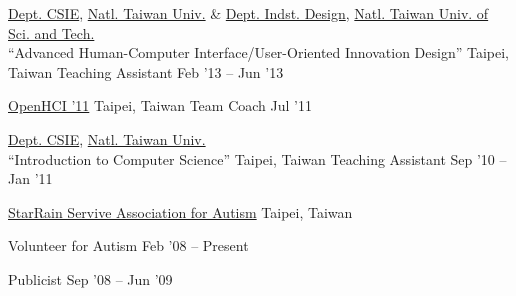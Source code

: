 \documentclass[10pt, a4paper]{article} %
\begin{document}


\headedsection
{
 \href{http://www.csie.ntu.edu.tw}{Dept. CSIE},
 \href{http://www.ntu.edu.tw}{Natl. Taiwan Univ.} \&
 \href{http://www.dt.ntust.edu.tw/}{Dept. Indst. Design},
 \href{http://www.ntust.edu.tw}{Natl. Taiwan Univ. of Sci. and Tech.}\\
 ``Advanced Human-Computer Interface/User-Oriented Innovation Design''
}
{Taipei, Taiwan}{
	\headedsubsection
	{Teaching Assistant}
	{Feb '13 -- Jun '13}
	{
	}
}

\headedsection
{
 \href{http://www.opehci.com/2011/}{OpenHCI '11}
}
{Taipei, Taiwan}{
	\headedsubsection
	{Team Coach}
	{Jul '11}
	{
	}
}

\headedsection
{
 \href{http://www.csie.ntu.edu.tw}{Dept. CSIE},
 \href{http://www.ntu.edu.tw}{Natl. Taiwan Univ.}\\
 ``Introduction to Computer Science''
}
{Taipei, Taiwan}{
	\headedsubsection
	{Teaching Assistant}
	{Sep '10 -- Jan '11}
	{
	}
}


\spacedhrule{1.5em}{-1em} %



\headedsection
{\href{http://goo.gl/2Dmqrj}{StarRain Servive Association for Autism}}
{Taipei, Taiwan}{

	\headedsubsection
	{Volunteer for Autism} 
	{Feb '08 -- Present}
	{}

	\headedsubsection
	{Publicist} 
	{Sep '08 -- Jun '09}
	{} 
}
\end{document}
